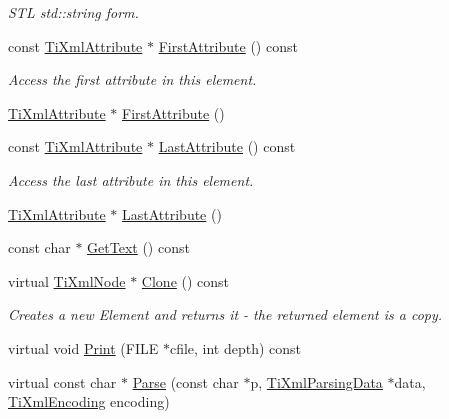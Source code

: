 \begin{DoxyCompactItemize}
\begin{DoxyCompactList}\small\item\em S\-T\-L std\-::string form. \end{DoxyCompactList}\item 
const \hyperlink{class_ti_xml_attribute}{Ti\-Xml\-Attribute} $\ast$ \hyperlink{class_ti_xml_element_a516054c9073647d6cb29b6abe9fa0592}{First\-Attribute} () const 
\begin{DoxyCompactList}\small\item\em Access the first attribute in this element. \end{DoxyCompactList}\item 
\hyperlink{class_ti_xml_attribute}{Ti\-Xml\-Attribute} $\ast$ \hyperlink{class_ti_xml_element_a4b33780fc565d38d6b54f640e0cf1737}{First\-Attribute} ()
\item 
const \hyperlink{class_ti_xml_attribute}{Ti\-Xml\-Attribute} $\ast$ \hyperlink{class_ti_xml_element_a86191b49f9177be132b85b14655f1381}{Last\-Attribute} () const 
\begin{DoxyCompactList}\small\item\em Access the last attribute in this element. \end{DoxyCompactList}\item 
\hyperlink{class_ti_xml_attribute}{Ti\-Xml\-Attribute} $\ast$ \hyperlink{class_ti_xml_element_a222f81cf06155cd108f2a68d4d176004}{Last\-Attribute} ()
\item 
const char $\ast$ \hyperlink{class_ti_xml_element_aa6dedd8a146acf3b1bc0903deb2d411a}{Get\-Text} () const 
\item 
virtual \hyperlink{class_ti_xml_node}{Ti\-Xml\-Node} $\ast$ \hyperlink{class_ti_xml_element_a13f6df105ebb1e8dc636e75cc883be32}{Clone} () const 
\begin{DoxyCompactList}\small\item\em Creates a new Element and returns it -\/ the returned element is a copy. \end{DoxyCompactList}\item 
virtual void \hyperlink{class_ti_xml_element_ad9d0c008866982ab8d9aafae7e14d692}{Print} (F\-I\-L\-E $\ast$cfile, int depth) const 
\item 
virtual const char $\ast$ \hyperlink{class_ti_xml_element_af95c9165159fd9dfdcc5b894a3fcf85b}{Parse} (const char $\ast$p, \hyperlink{class_ti_xml_parsing_data}{Ti\-Xml\-Parsing\-Data} $\ast$data, \hyperlink{tinyxml_8h_a88d51847a13ee0f4b4d320d03d2c4d96}{Ti\-Xml\-Encoding} encoding)
\item 

\end{DoxyCompactItemize}
